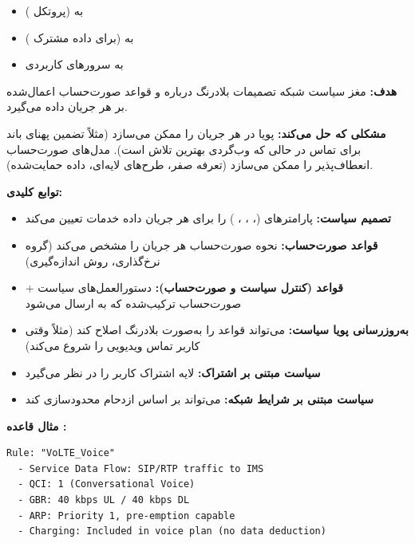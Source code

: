 \begin{itemize}
\tightlist
\item
   به  (پروتکل )
\item
   به  (برای داده مشترک )
\item
   به سرورهای کاربردی
\end{itemize}


\textbf{هدف:} مغز سیاست شبکه  تصمیمات بلادرنگ درباره  و قواعد صورت‌حساب اعمال‌شده بر هر جریان داده می‌گیرد.

\textbf{مشکلی که حل می‌کند:}  پویا در هر جریان را ممکن می‌سازد (مثلاً تضمین پهنای باند برای تماس  در حالی که وب‌گردی بهترین تلاش است). مدل‌های صورت‌حساب انعطاف‌پذیر را ممکن می‌سازد (تعرفه صفر، طرح‌های لایه‌ای، داده حمایت‌شده).

\textbf{توابع کلیدی:}

\begin{itemize}
\tightlist
\item
  \textbf{تصمیم سیاست:} پارامترهای  (، ، ، ) را برای هر جریان داده خدمات تعیین می‌کند
\item
  \textbf{قواعد صورت‌حساب:} نحوه صورت‌حساب هر جریان را مشخص می‌کند (گروه نرخ‌گذاری، روش اندازه‌گیری)
\item
  \textbf{قواعد  (کنترل سیاست و صورت‌حساب):} دستورالعمل‌های سیاست + صورت‌حساب ترکیب‌شده که به  ارسال می‌شود
\item
  \textbf{به‌روزرسانی پویا سیاست:} می‌تواند قواعد را به‌صورت بلادرنگ اصلاح کند (مثلاً وقتی کاربر تماس ویدیویی را شروع می‌کند)
\item
  \textbf{سیاست مبتنی بر اشتراک:} لایه اشتراک کاربر را در نظر می‌گیرد
\item
  \textbf{سیاست مبتنی بر شرایط شبکه:} می‌تواند بر اساس ازدحام محدودسازی کند
\end{itemize}

\textbf{مثال قاعده :}

\def\CNcodelang{}

\begin{CNplaincode}
\begin{Verbatim}
Rule: "VoLTE_Voice"
  - Service Data Flow: SIP/RTP traffic to IMS
  - QCI: 1 (Conversational Voice)
  - GBR: 40 kbps UL / 40 kbps DL
  - ARP: Priority 1, pre-emption capable
  - Charging: Included in voice plan (no data deduction)
\end{Verbatim}
\end{CNplaincode}

